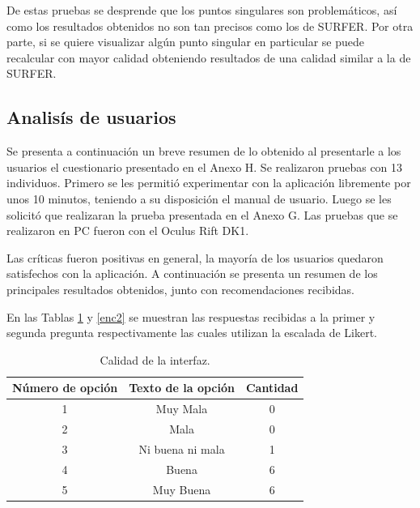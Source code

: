 \documentclass[12pt]{article}
\begin{document}
De estas pruebas se desprende que los puntos singulares son problemáticos, así como los resultados obtenidos no son tan precisos como los de SURFER. Por otra parte, si se quiere visualizar algún punto singular en particular se puede recalcular con mayor calidad obteniendo resultados de una calidad similar a la de SURFER.

\subsection{Analisís de usuarios}
\noindent Se presenta a continuación un breve resumen de lo obtenido al presentarle a los usuarios el cuestionario presentado en el Anexo H. Se realizaron pruebas con 13 individuos. Primero se les permitió experimentar con la aplicación libremente por unos 10 minutos, teniendo a su disposición el manual de usuario. Luego se les solicitó que realizaran la prueba presentada en el Anexo G. Las pruebas que se realizaron en PC fueron con el Oculus Rift DK1.

Las críticas fueron positivas en general, la mayoría de los usuarios quedaron satisfechos con la aplicación. A continuación se presenta un resumen de los principales resultados obtenidos, junto con recomendaciones recibidas.

En las Tablas \ref{enc1} y \ref{enc2} se muestran las respuestas recibidas a la primer y segunda pregunta respectivamente las cuales utilizan la escalada de Likert.
\begin{table}[h!]
  \centering
  \begin{tabular}{ccc}
    \toprule
    Número de opción &  Texto de la opción &Cantidad\\
    \midrule
    1 & Muy Mala & 0 \\
    2 & Mala & 0 \\
    3 & Ni buena ni mala & 1 \\
    4 & Buena & 6\\
    5 & Muy Buena & 6\\
    \bottomrule
  \end{tabular}
  \caption{Calidad de la interfaz.}
  \label{enc1}
\end{table}

\end{document}
